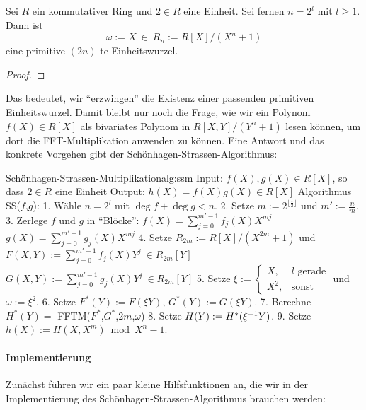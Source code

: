 \begin{lemma}
  Sei $R$ ein kommutativer Ring und $2 \in R$ eine Einheit. Sei fernen 
  $n = 2^l$ mit $l\geq 1$. Dann ist 
  \[ \omega := X\  \in\ R_n := R[X]\big/(X^n+1)\]
  eine primitive $(2n)$-te Einheitswurzel.
\end{lemma}
\begin{proof}
  
\end{proof}

Das bedeutet, wir "`erzwingen"' die Existenz einer passenden primitiven
Einheitswurzel. Damit bleibt nur noch die Frage, wie wir ein Polynom 
$f(X) \in R[X]$ als bivariates Polynom in $R[X,Y]\big/(Y^n+1)$ lesen können, um
dort die FFT-Multiplikation anwenden zu können. Eine Antwort und das konkrete
Vorgehen gibt der Schönhagen-Strassen-Algorithmus:

\begin{pseudocode}{Schönhagen-Strassen-Multiplikation}{alg:ssm}
Input: $f(X),g(X) \in R[X]$, so dass $2 \in R$ eine Einheit
Output: $h(X) = f(X)g(X) \in R[X]$
Algorithmus SS($f$,$g$):
  1. Wähle $n = 2^l$ mit $\deg f + \deg g < n$.
  2. Setze $m := 2^{\lfloor\tfrac l 2\rfloor}$ und $m' := \tfrac n m$.
  3. Zerlege $f$ und $g$ in "`Blöcke"':
     $f(X) = \sum_{j=0}^{m'-1} f_j(X) X^{mj}$
     $g(X) = \sum_{j=0}^{m'-1} g_j(X) X^{mj}$
  4. Setze $R_{2m} := R[X]\big/(X^{2m}+1)$ und 
     $F(X,Y) := \sum_{j=0}^{m'-1} f_j(X) Y^j\ \in R_{2m}[Y]$
     $G(X,Y) := \sum_{j=0}^{m'-1} g_j(X) Y^j\ \in R_{2m}[Y]$
  5. Setze $\xi := \begin{cases} X, & l \text{ gerade}\\ X^2, &
      \text{sonst}\end{cases}$ und $\omega := \xi^2$.
  6. Setze $F^\ast(Y) := F(\xi Y)$, $G^\ast(Y) := G(\xi Y)$.
  7. Berechne $H^\ast(Y) = $ FFTM($F^\ast$,$G^\ast$,$2m$,$\omega$)
  8. Setze $H(Y) := H^\ast(\xi^{-1} Y)$.
  9. Setze $h(X) := H(X,X^m) \bmod{X^n-1}$.
\end{pseudocode}

\paragraph{Implementierung}
Zunächst führen wir ein paar kleine Hilfsfunktionen an, die wir in der
Implementierung des Schönhagen-Strassen-Algorithmus brauchen werden:

